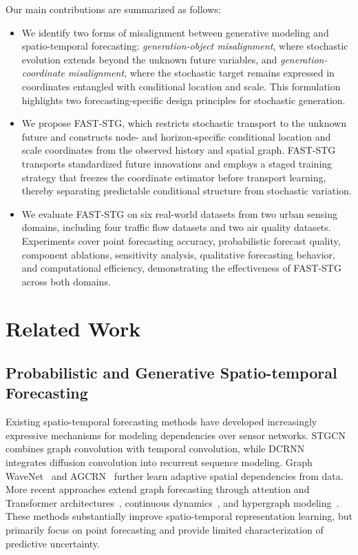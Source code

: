 \documentclass[sigconf, anonymous, review]{acmart}
\begin{document}
Our main contributions are summarized as follows:

\begin{itemize}

\item We identify two forms of misalignment between generative modeling
and spatio-temporal forecasting:
\emph{generation-object misalignment}, where stochastic evolution
extends beyond the unknown future variables, and
\emph{generation-coordinate misalignment}, where the stochastic target
remains expressed in coordinates entangled with conditional location
and scale. This formulation highlights two forecasting-specific design
principles for stochastic generation.

\item We propose FAST-STG, which restricts stochastic transport to the
unknown future and constructs node- and horizon-specific conditional
location and scale coordinates from the observed history and spatial
graph. FAST-STG transports standardized future innovations and employs
a staged training strategy that freezes the coordinate estimator before
transport learning, thereby separating predictable conditional
structure from stochastic variation.

\item We evaluate FAST-STG on six real-world datasets from two urban
sensing domains, including four traffic flow datasets and two air
quality datasets. Experiments cover point forecasting accuracy,
probabilistic forecast quality, component ablations, sensitivity
analysis, qualitative forecasting behavior, and computational
efficiency, demonstrating the effectiveness of FAST-STG across both
domains.

\end{itemize}

\section{Related Work}
\subsection{Probabilistic and Generative Spatio-temporal Forecasting}

Existing spatio-temporal forecasting methods have developed increasingly
expressive mechanisms for modeling dependencies over sensor networks.
STGCN~\cite{yu2018spatio} combines graph convolution with temporal
convolution, while DCRNN~\cite{li2018diffusion} integrates diffusion
convolution into recurrent sequence modeling. Graph
WaveNet~\cite{wu2019graph} and AGCRN~\cite{bai2020adaptive} further
learn adaptive spatial dependencies from data. More recent approaches
extend graph forecasting through attention and Transformer
architectures~\cite{liang2023airformer,han2021jointair}, continuous
dynamics~\cite{long2024delay,wu2026airdde}, and hypergraph
modeling~\cite{zhang2026msthg}. These methods substantially improve
spatio-temporal representation learning, but primarily focus on point
forecasting and provide limited characterization of predictive
uncertainty.
\end{document}
